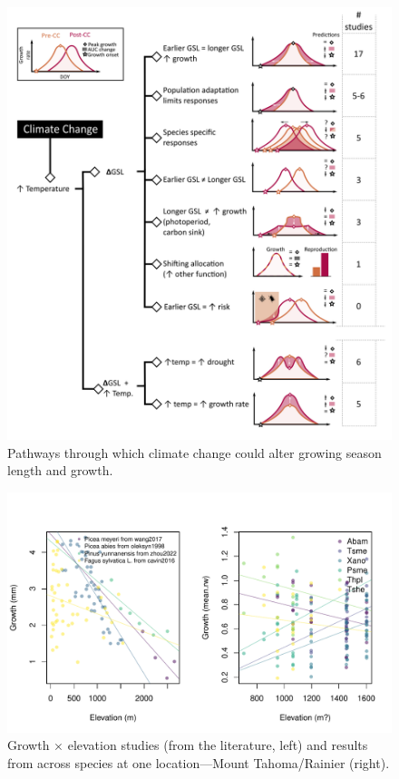 \documentclass[11pt]{article}
\begin{document}
\clearpage
\begin{figure}[h!]
\includegraphics[width=1\textwidth]{..//figures/hypothesesconceptfig.png}
\caption{Pathways through which climate change could alter growing season length and growth.}
\label{fig:hypotheses}
\end{figure}

\begin{figure}[h!]
\includegraphics[width=1\textwidth]{..//analyses/growthxelevationetc/figures/growthxelev2part.pdf}
\caption{Growth $\times$ elevation studies (from the literature, left) and results from across species at one location---Mount Tahoma/Rainier (right).}
\label{fig:gxelev}
\end{figure}
\end{document}
